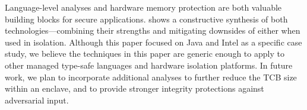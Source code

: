 \label{sec:conclusion}

Language-level analyses and hardware memory protection are both valuable
building blocks for secure applications.
\sysname{} shows a constructive synthesis of both technologies---combining their strengths
and mitigating downsides of either when used in isolation.
Although this paper focused on Java and Intel \sgx{} as a specific case study,
we believe the techniques in this paper are generic enough to apply to
other managed type-safe languages and hardware isolation platforms.
In future work, we plan to incorporate additional analyses
to further reduce the TCB size within an enclave, and to provide
stronger integrity protections against adversarial input.


